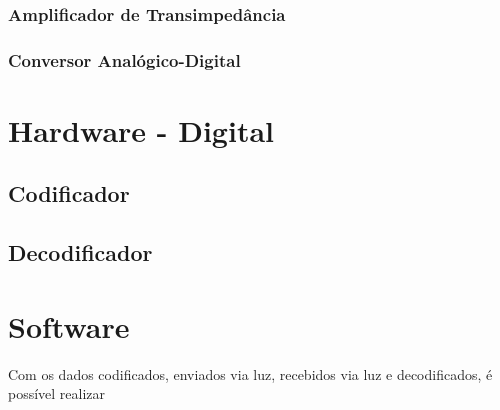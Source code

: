 		
		
	\subsubsection{Amplificador de Transimpedância}
	
	\subsubsection{Conversor Analógico-Digital}
	
	\section{Hardware - Digital}
	\subsection{Codificador}
	
	\subsection{Decodificador}
	
	\section{Software}
		Com os dados codificados, enviados via luz, recebidos via luz e decodificados, é possível realizar 